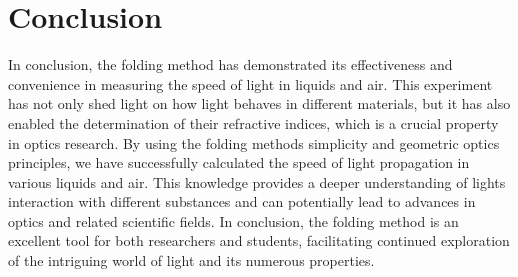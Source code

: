 \section{Conclusion}
In conclusion, the folding method has demonstrated its effectiveness and convenience in measuring the speed of light in liquids and air. This experiment has not only shed light on how light behaves in different materials, but it has also enabled the determination of their refractive indices, which is a crucial property in optics research. By using the folding methods simplicity and geometric optics principles, we have successfully calculated the speed of light propagation in various liquids and air. This knowledge provides a deeper understanding of lights interaction with different substances and can potentially lead to advances in optics and related scientific fields. In conclusion, the folding method is an excellent tool for both researchers and students, facilitating continued exploration of the intriguing world of light and its numerous properties.